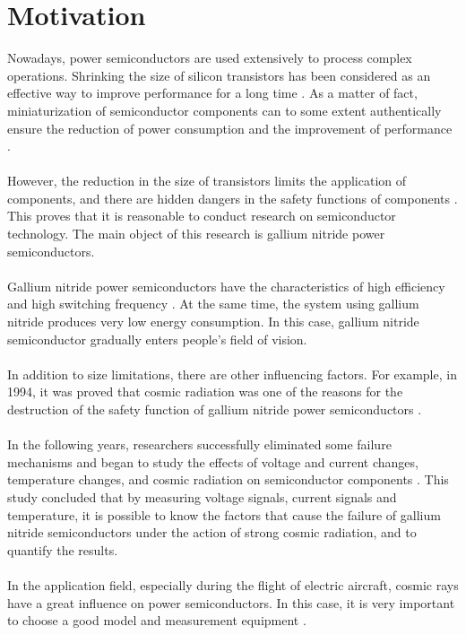 \section{Motivation}
\label{Motivation}
Nowadays, power semiconductors are used extensively to process complex operations. Shrinking the size of silicon transistors has been considered as an effective way to improve performance for a long time \cite{specovius2010grundkurs}. As a matter of fact, miniaturization of semiconductor components can to some extent authentically ensure the reduction of power consumption and the improvement of performance \cite{epicoco2013knowledge}. 
\\
\\
However, the reduction in the size of transistors limits the application of components, and there are hidden dangers in the safety functions of components \cite{shauly2012cmos}. This proves that it is reasonable to conduct research on semiconductor technology. The main object of this research is gallium nitride power semiconductors.
\\
\\
Gallium nitride power semiconductors have the characteristics of high efficiency and high switching frequency \cite{6064128}. At the same time, the system using gallium nitride produces very low energy consumption. In this case, gallium nitride semiconductor gradually enters people's field of vision.
\\
\\
In addition to size limitations, there are other influencing factors. For example, in 1994, it was proved that cosmic radiation was one of the reasons for the destruction of the safety function of gallium nitride power semiconductors \cite{583620}.
\\
\\
In the following years, researchers successfully eliminated some failure mechanisms and began to study the effects of voltage and current changes, temperature changes, and cosmic radiation on semiconductor components \cite{4328188}.
This study concluded that by measuring voltage signals, current signals and temperature, it is possible to know the factors that cause the failure of gallium nitride semiconductors under the action of strong cosmic radiation, and to quantify the results.
\\
\\
In the application field, especially during the flight of electric aircraft, cosmic rays have a great influence on power semiconductors. In this case, it is very important to choose a good model and measurement equipment \cite{hoehenstrahlungsinduzierter}.
